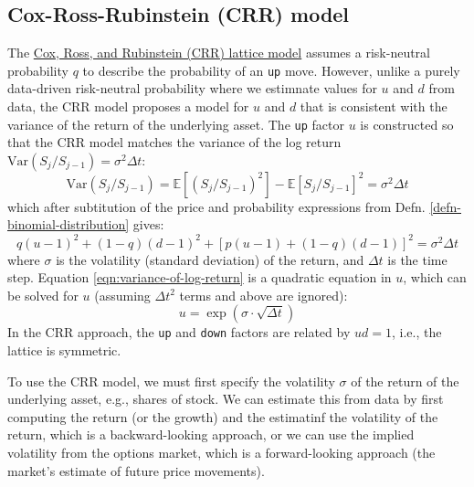 \documentclass[11pt]{article}
\theoremstyle{definition}
\begin{document}
\subsection*{Cox-Ross-Rubinstein (CRR) model}
The \href{https://en.wikipedia.org/wiki/Binomial_options_pricing_model}{Cox, Ross, and Rubinstein (CRR) lattice model} 
assumes a risk-neutral probability $q$ to describe the probability of an \texttt{up} move. However, unlike a purely data-driven risk-neutral probability where we estimnate 
values for $u$ and $d$ from data, the CRR model proposes a model for $u$ and $d$ that is consistent with the variance of the return of the underlying asset.
The \texttt{up} factor $u$ is constructed so that the CRR model matches the variance of the log return $\text{Var}(S_{j}/S_{j-1})=\sigma^{2}\Delta{t}$:
\begin{equation*}
	\text{Var}(S_{j}/S_{j-1}) = \mathbb{E}\left[(S_{j}/S_{j-1})^{2}\right] - \mathbb{E}\left[S_{j}/S_{j-1}\right]^{2} = \sigma^{2}\Delta{t}
\end{equation*}
which after subtitution of the price and probability expressions from Defn. \ref{defn-binomial-distribution} gives:
\begin{equation}\label{eqn:variance-of-log-return}
    q(u-1)^{2} + (1-q)(d-1)^{2} + \left[p(u-1)+(1-q)(d-1)\right]^{2} = \sigma^{2}\Delta{t}
\end{equation}
where $\sigma$ is the volatility (standard deviation) of the return, and $\Delta{t}$ is the time step.
Equation \eqref{eqn:variance-of-log-return} is a quadratic equation in $u$, which can be solved for $u$ (assuming $\Delta{t}^{2}$ terms and above are ignored):
\begin{equation*}
    u = \exp(\sigma\cdot\sqrt{\Delta{t}})
\end{equation*} 
In the CRR approach, the \texttt{up} and \texttt{down} factors are related by $ud=1$, i.e., the lattice is symmetric.

To use the CRR model, we must first specify the volatility $\sigma$ of the return of the underlying asset, e.g., shares of stock.
We can estimate this from data by first computing the return (or the growth) and the estimatinf the volatility of the return, which is a backward-looking approach, 
or we can use the implied volatility from the options market, which is a forward-looking approach (the market's estimate of future price movements).
\end{document}
